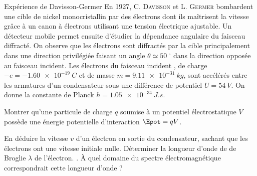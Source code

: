 
\begin{exo}[PC][2][TD]{Expérience de Davisson-Germer}
  En 1927, C. \textsc{Davisson} et L. \textsc{Germer} bombardent une cible de nickel monocristallin par des électrons dont ils maîtrisent la vitesse grâce à un canon à électrons utilisant une tension électrique ajustable. Un détecteur mobile permet ensuite d'étudier la dépendance angulaire du faisceau diffracté. On observe que les électrons sont diffractés par la cible principalement dans une direction privilégiée faisant un angle $\theta \simeq \SI{50}{^\circ}$ dans la direction opposée au faisceau incident. Les électrons du faisceau incident , de charge $-e = \SI{-1.60e-19}{C}$ et de masse $m=\SI{9.11e-31}{kg}$, sont accélérés entre les armatures d'un condensateur sous une différence de potentiel $U = \SI{54}{V}$. On donne la constante de Planck $h=\SI{1.05e-34}{J.s}$.

  \begin{quest}
    \item	Montrer qu'une particule de charge $q$ soumise à un potentiel électrostatique $V$ possède une énergie potentielle d'interaction $\Epot = qV$.
    \item En déduire la vitesse $v$ d'un électron en sortie du condensateur, sachant que les électrons ont une vitesse initiale nulle. Déterminer la longueur d'onde de de Broglie $\lambda$ de l'électron. \AN. À quel domaine du spectre électromagnétique correspondrait cette longueur d'onde ?
  \end{quest}
    

\end{exo}
